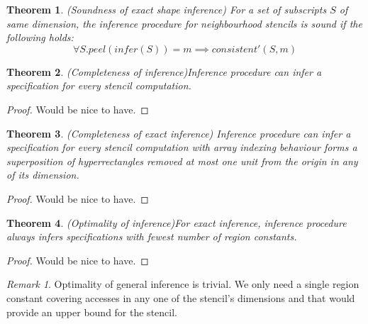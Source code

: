\documentclass[acmlarge,review]{acmart}
\theoremstyle{definition}
\theoremstyle{plain}
\newtheorem{thm}{Theorem}
\theoremstyle{remark}
\newtheorem{remark}{Remark}
\begin{document}
\begin{thm}{(Soundness of exact shape inference)}
  For a set of subscripts $S$ of same dimension, the inference procedure for
  neighbourhood stencils is sound if the following holds:
%
  \begin{equation*}
    \forall S. \mathit{peel}(\mathit{infer}(S)) = m \implies
      \mathit{consistent'}(S,m)
  \end{equation*}
\end{thm}

\begin{thm}{(Completeness of inference)}\label{thm:inf-completeness}
  Inference procedure can infer a specification for every stencil computation.
\end{thm}
%
\begin{proof}
  Would be nice to have.
\end{proof}

\begin{thm}{(Completeness of exact inference)}
  Inference procedure can infer a specification for every stencil computation
  with array indexing behaviour forms a superposition of hyperrectangles removed
  at most one unit from the origin in any of its dimension.
\end{thm}
%
\begin{proof}
  Would be nice to have.
\end{proof}

\begin{thm}{(Optimality of inference)}\label{thm:inf-optimality}
  For exact inference, inference procedure always infers specifications with
  fewest number of region constants.
\end{thm}
%
\begin{proof}
  Would be nice to have.
\end{proof}

\begin{remark}{}
  Optimality of general inference is trivial. We only need a single region
  constant covering accesses in any one of the stencil's dimensions and that
  would provide an upper bound for the stencil.
\end{remark}
\end{document}
